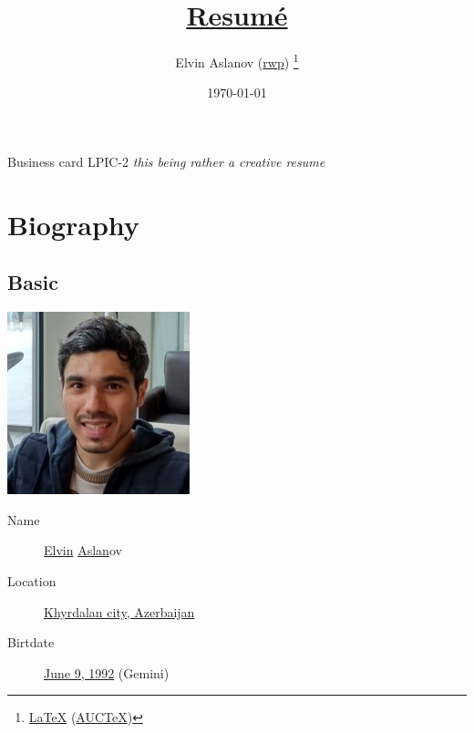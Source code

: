 \documentclass {article}
\title {\href{https://github.com/rwp0/resume}{Resumé}}
\author {Elvin Aslanov (\href{https://rwp0.github.io/}{rwp}) \thanks{\href{https://en.wikipedia.org/wiki/LaTeX}{\LaTeX} (\href{https://www.gnu.org/software/auctex/}{AUCTeX})}}
\date {\today}
\begin{document}
    \begin {titlepage}
        \maketitle
    \end {titlepage}
     {Business card}
     {LPIC-2}
    \textit {this being rather a creative resume}

    \section {Biography}

    \subsection {Basic}
    \includegraphics [scale = 0.5] {resume.jpg}
    \begin {description}
        \item [Name] \href{https://en.wiktionary.org/wiki/Elvin}{Elvin} \href{https://en.wiktionary.org/wiki/Aslan}{Aslan}ov
        \item [Location] \href{https://www.openstreetmap.org/way/186275017}{Khyrdalan city, Azerbaijan}
        \item [Birtdate] \href{https://www.timeanddate.com/date/durationresult.html?m1=06&d1=09&y1=1992}{June 9, 1992} (Gemini)
    \end {description}
\end{document}

